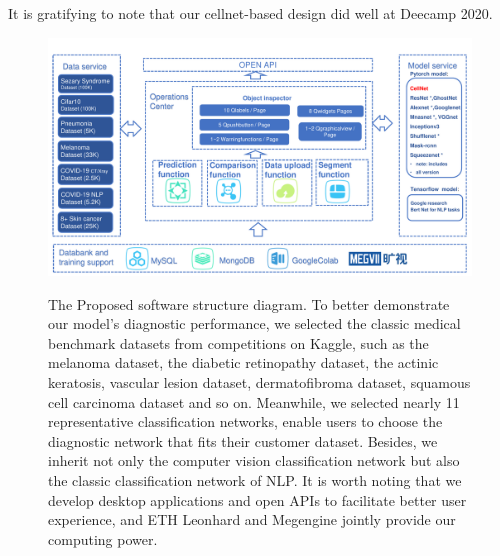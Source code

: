 It is gratifying to note that our cellnet-based design did well at  Deecamp 2020.
\begin{figure}[t]
\begin{center}
\includegraphics[height=0.3\textheight]{thesis-template-master/images/2020DeeCamp_ppt_tcy (1).pdf}
\label{fig:cellnet}
\end{center}
\caption{ The Proposed software structure diagram.
To better demonstrate our model's diagnostic performance, we selected the classic medical benchmark datasets from competitions on Kaggle, such as the melanoma dataset, the diabetic retinopathy dataset, the actinic keratosis, vascular lesion dataset, dermatofibroma dataset, squamous cell carcinoma dataset and so on. Meanwhile, we selected nearly 11  representative classification networks, enable users to choose the diagnostic network that fits their customer dataset. Besides, we inherit not only the computer vision classification network but also the classic classification network of NLP. It is worth noting that we develop desktop applications and open APIs to facilitate better user experience, and ETH Leonhard and Megengine jointly provide our computing power.}
\end{figure}


